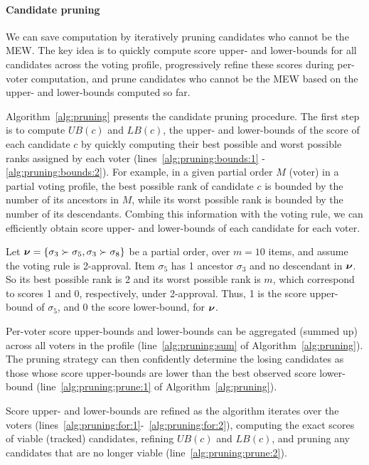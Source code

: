 \paragraph{Candidate pruning}
We can save computation by iteratively pruning candidates who cannot be the MEW.
The key idea is to quickly compute score upper- and lower-bounds for all candidates across the voting profile,  progressively refine these scores during per-voter computation, and prune candidates who cannot be the MEW based on the upper- and lower-bounds computed so far.

Algorithm~\ref{alg:pruning} presents the candidate pruning procedure. The first step is to compute $UB(c)$ and $LB(c)$, the upper- and lower-bounds of the score of each candidate $c$ by quickly computing their best possible and worst possible ranks assigned by each voter (lines~\ref{alg:pruning:bounds:1} - \ref{alg:pruning:bounds:2}).  For example, in a given partial order $M$ (voter) in a partial voting profile, the best possible rank of candidate $c$ is bounded by the number of its ancestors in $M$, while its worst possible rank is bounded by the number of its descendants.  Combing this information with the voting rule, we can efficiently obtain score upper- and lower-bounds of each candidate for each voter.

\begin{example}
  Let $\bm{\nu}=\{ \sigma_3 \succ \sigma_5, \sigma_3 \succ \sigma_8 \}$ be a partial order, over $m=10$ items, and assume the voting rule is 2-approval.
  Item $\sigma_5$ has 1 ancestor $\sigma_3$ and no descendant in $\bm{\nu}$.
  So its best possible rank is 2 and its worst possible rank is $m$, which correspond to scores 1 and 0, respectively, under 2-approval.  Thus, 1 is the score upper-bound of $\sigma_5$, and 0 the score lower-bound, for $\bm{\nu}$.
\end{example}

Per-voter score upper-bounds and lower-bounds can be aggregated (summed up) across all voters in the profile (line~\ref{alg:pruning:sum} of Algorithm~\ref{alg:pruning}).  The pruning strategy can then confidently determine the losing candidates as those whose score upper-bounds are lower than the best observed score lower-bound (line~\ref{alg:pruning:prune:1} of Algorithm~\ref{alg:pruning}).  


Score upper- and lower-bounds are refined as the algorithm iterates over the voters (lines~\ref{alg:pruning:for:1}-~\ref{alg:pruning:for:2}), computing the exact scores of viable (tracked) candidates, refining $UB(c)$ and $LB(c)$, and pruning any candidates that are no longer viable (line~\ref{alg:pruning:prune:2}).


